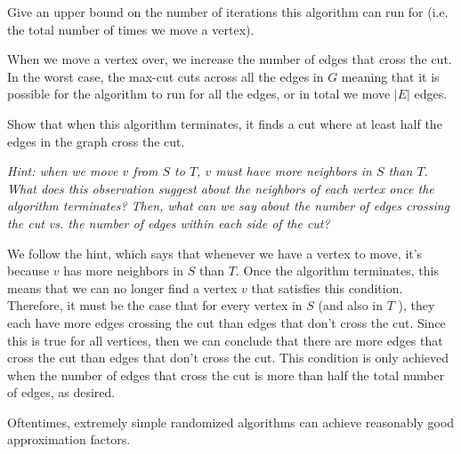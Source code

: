 \documentclass[11pt]{article}
\begin{document}
\begin{subparts}
\subpart Give an upper bound on the number of iterations this algorithm can run for (i.e. the total number of times we move a vertex).

\begin{solution}
	When we move a vertex over, we increase the number of edges that cross the cut. In the worst case, the max-cut cuts across 
	all the edges in \( G \) meaning that it is possible for the algorithm to run for all the edges, or in total we move 
	\( |E| \) edges. 
\end{solution}
\subpart Show that when this algorithm terminates, it finds a cut where at least half the edges in the graph cross the cut.

\textit{Hint: when we move $v$ from $S$ to $T$, $v$ must have more neighbors in $S$ than $T$. What does this observation suggest about the neighbors of each vertex once the algorithm terminates? Then, what can we say about the number of edges crossing the cut vs. the number of edges within each side of the cut?}

\begin{solution}
	We follow the hint, which says that whenever we have a vertex to move, it's because \( v \) has more neighbors in \( S \) than 
	\( T \). Once the algorithm terminates, this means that we can no longer find a vertex \( v \) that satisfies this condition. 
	Therefore, it must be the case that for every vertex in \( S \) (and also in \( T \) ), they each have more edges crossing the cut
	than edges that don't cross the cut. Since this is true for all vertices, then we can conclude that there are more edges 
	that cross the cut than edges that don't cross the cut. This condition is only achieved when the number of edges that cross the 
	cut is more than half the total number of edges, as desired. 
\end{solution}
\end{subparts}

\newpage


Oftentimes, extremely simple randomized algorithms can achieve reasonably good approximation factors.
\end{document}
